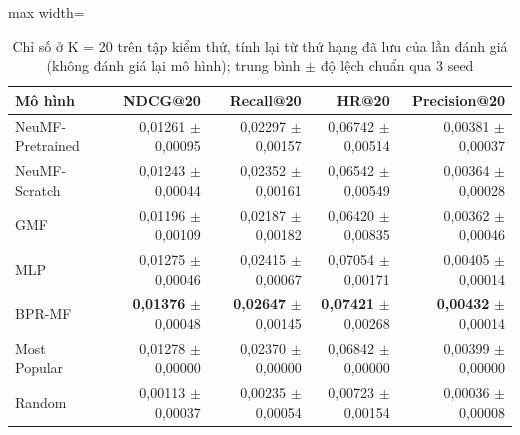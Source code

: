 \begin{table}[htbp]
    \centering\small
    \caption{Chỉ số ở K = 20 trên tập kiểm thử, tính lại từ thứ hạng đã lưu của lần đánh giá (không đánh giá lại mô hình); trung bình $\pm$ độ lệch chuẩn qua 3 seed}
    \label{tab:k20}
    \begin{adjustbox}{max width=\textwidth}
    \begin{tabular}{lrrrr}
        \toprule
        Mô hình & NDCG@20 & Recall@20 & HR@20 & Precision@20 \\
        \midrule
        NeuMF-Pretrained & 0{,}01261 $\pm$ 0{,}00095 & 0{,}02297 $\pm$ 0{,}00157 & 0{,}06742 $\pm$ 0{,}00514 & 0{,}00381 $\pm$ 0{,}00037 \\
        NeuMF-Scratch & 0{,}01243 $\pm$ 0{,}00044 & 0{,}02352 $\pm$ 0{,}00161 & 0{,}06542 $\pm$ 0{,}00549 & 0{,}00364 $\pm$ 0{,}00028 \\
        GMF & 0{,}01196 $\pm$ 0{,}00109 & 0{,}02187 $\pm$ 0{,}00182 & 0{,}06420 $\pm$ 0{,}00835 & 0{,}00362 $\pm$ 0{,}00046 \\
        MLP & 0{,}01275 $\pm$ 0{,}00046 & 0{,}02415 $\pm$ 0{,}00067 & 0{,}07054 $\pm$ 0{,}00171 & 0{,}00405 $\pm$ 0{,}00014 \\
        BPR-MF & \textbf{0{,}01376} $\pm$ 0{,}00048 & \textbf{0{,}02647} $\pm$ 0{,}00145 & \textbf{0{,}07421} $\pm$ 0{,}00268 & \textbf{0{,}00432} $\pm$ 0{,}00014 \\
        Most Popular & 0{,}01278 $\pm$ 0{,}00000 & 0{,}02370 $\pm$ 0{,}00000 & 0{,}06842 $\pm$ 0{,}00000 & 0{,}00399 $\pm$ 0{,}00000 \\
        Random & 0{,}00113 $\pm$ 0{,}00037 & 0{,}00235 $\pm$ 0{,}00054 & 0{,}00723 $\pm$ 0{,}00154 & 0{,}00036 $\pm$ 0{,}00008 \\
        \bottomrule
    \end{tabular}
    \end{adjustbox}
    \par{}
\end{table}
